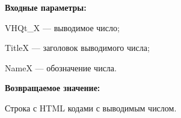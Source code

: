 \textbf{Входные параметры:}

VHQt\_X --- выводимое число;
 
    TitleX --- заголовок выводимого числа;
 
    NameX --- обозначение числа.

\textbf{Возвращаемое значение:}

Строка с HTML кодами с выводимым числом.